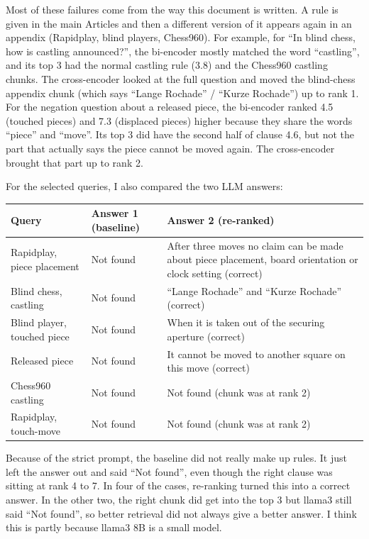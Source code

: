 \documentclass[11pt,a4paper]{article}
\begin{document}
Most of these failures come from the way this document is written. A rule is given in the main Articles and then a different version of it appears again in an appendix (Rapidplay, blind players, Chess960). For example, for ``In blind chess, how is castling announced?'', the bi-encoder mostly matched the word ``castling'', and its top 3 had the normal castling rule (3.8) and the Chess960 castling chunks. The cross-encoder looked at the full question and moved the blind-chess appendix chunk (which says ``Lange Rochade'' / ``Kurze Rochade'') up to rank 1. For the negation question about a released piece, the bi-encoder ranked 4.5 (touched pieces) and 7.3 (displaced pieces) higher because they share the words ``piece'' and ``move''. Its top 3 did have the second half of clause 4.6, but not the part that actually says the piece cannot be moved again. The cross-encoder brought that part up to rank 2.

For the selected queries, I also compared the two LLM answers:

\begin{center}
\small
\begin{tabularx}{\textwidth}{@{}p{3.4cm} p{3cm} Y@{}}
\toprule
Query & Answer 1 (baseline) & Answer 2 (re-ranked) \\
\midrule
Rapidplay, piece placement & Not found & After three moves no claim can be made about piece placement, board orientation or clock setting (correct) \\
\addlinespace
Blind chess, castling & Not found & ``Lange Rochade'' and ``Kurze Rochade'' (correct) \\
\addlinespace
Blind player, touched piece & Not found & When it is taken out of the securing aperture (correct) \\
\addlinespace
Released piece & Not found & It cannot be moved to another square on this move (correct) \\
\addlinespace
Chess960 castling & Not found & Not found (chunk was at rank 2) \\
\addlinespace
Rapidplay, touch-move & Not found & Not found (chunk was at rank 2) \\
\bottomrule
\end{tabularx}
\end{center}

Because of the strict prompt, the baseline did not really make up rules. It just left the answer out and said ``Not found'', even though the right clause was sitting at rank 4 to 7. In four of the cases, re-ranking turned this into a correct answer. In the other two, the right chunk did get into the top 3 but llama3 still said ``Not found'', so better retrieval did not always give a better answer. I think this is partly because llama3 8B is a small model.
\end{document}
